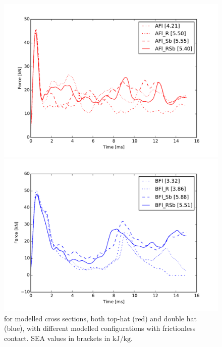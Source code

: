 \documentclass[
documentsize = a4, %
font = cmr, %
typesize = 11, %
printmode = true,
onehalfspacing = true,
language = en, %
titlepage = udciccp, %
degree = pt, %
dedication = true,
acknowledgements = true,
abstract-en = true,
abstract-es = false,
abstract-ga = false,
epigraphs = true,
toc = true,
lof = true,
lot = true,
frontmatterintoc = false,
notation = false,
minimal = false,
]{UDCthesis}
\begin{document}
\begin{figure}
	\centering
	\begin{minipage}[b]{.9\linewidth}
		\centering
		\includegraphics[width=\linewidth]{IMG_CUTRES/AFl}
	\end{minipage}
	\quad
	\begin{minipage}[b]{.9\linewidth}
		\centering
		\includegraphics[width=\linewidth]{IMG_CUTRES/BFl}
	\end{minipage}
	\caption[ for modelled cross sections, both top-hat and double hat, with different modelled configurations with frictionless contact.]{ for modelled cross sections, both top-hat (red) and double hat (blue), with different modelled configurations with frictionless contact. \Gls{SEA} values in brackets in $\si{\kJ/\kg}$.}
	\label{fig:F-D_frictionless}
\end{figure}
\end{document}
